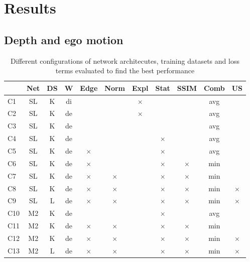 \chapter{Results}\label{cha:results}

\section{Depth and ego motion}

\begin{table}[H]
\begin{tabular}{|l|c|c|c|c|c|c|c|c|c|c|}
\hline
 & Net & DS & W & Edge & Norm & Expl & Stat & SSIM & Comb & US \\
\hline
C1 & SL & K & di &  &  & $ \times $ &  &  & avg &  \\
\hline
C2 & SL & K & de &  &  & $ \times $ &  &  & avg &  \\
\hline
C3 & SL & K & de &  &  &  &  &  & avg &  \\
\hline
C4 & SL & K & de &  &  &  & $ \times $ &  & avg &  \\
\hline
C5 & SL & K & de & $ \times $ &  &  & $ \times $ &  & avg &  \\
\hline
C6 & SL & K & de & $ \times $ &  &  & $ \times $ & $ \times $ & min &  \\
\hline
C7 & SL & K & de & $ \times $ & $ \times $ &  & $ \times $ & $ \times $ & min &  \\
\hline
C8 & SL & K & de & $ \times $ & $ \times $ &  & $ \times $ & $ \times $ & min & $ \times $ \\
\hline
C9 & SL & L & de & $ \times $ & $ \times $ &  & $ \times $ & $ \times $ & min & $ \times $ \\
\hline
C10 & M2 & K & de &  &  &  & $ \times $ &  & avg &  \\
\hline
C11 & M2 & K & de & $ \times $ & $ \times $ &  & $ \times $ & $ \times $ & min &  \\
\hline
C12 & M2 & K & de & $ \times $ & $ \times $ &  & $ \times $ & $ \times $ & min & $ \times $ \\
\hline
C13 & M2 & L & de & $ \times $ & $ \times $ &  & $ \times $ & $ \times $ & min & $ \times $ \\
\hline
\end{tabular}
\caption{Different configurations of network architecutes, training datasets and loss terms evaluated to find the best performance}
\label{table:configurations}
\end{table}


